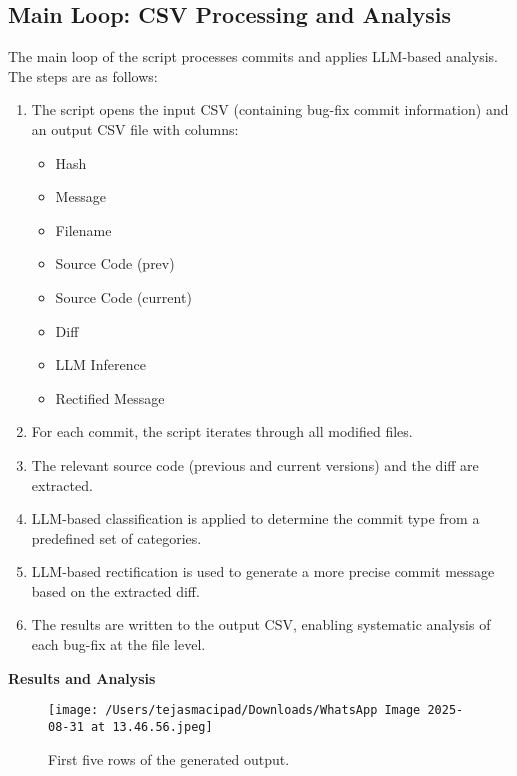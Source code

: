 \documentclass[12pt, a4paper]{report}
\newcommand{\sectionbar}[1]{%
  \vspace{0.6\baselineskip}%
  \noindent
  \colorbox{sectionbar}{%
    \parbox{\dimexpr\linewidth-2\fboxsep\relax}{%
      \textbf{\Large\textsf{#1}}%
    }%
  }%
  \vspace{0.6\baselineskip}
}
\begin{document}
    \subsection{Main Loop: CSV Processing and Analysis}
        The main loop of the script processes commits and applies LLM-based analysis. The steps are as follows:

        \begin{enumerate}
            \item The script opens the input CSV (containing bug-fix commit information) and an output CSV file with columns:
            \begin{itemize}
                \item Hash
                \item Message
                \item Filename
                \item Source Code (prev)
                \item Source Code (current)
                \item Diff
                \item LLM Inference
                \item Rectified Message
            \end{itemize}
            
            \item For each commit, the script iterates through all modified files.
            
            \item The relevant source code (previous and current versions) and the diff are extracted.
            
            \item LLM-based classification is applied to determine the commit type from a predefined set of categories.
            
            \item LLM-based rectification is used to generate a more precise commit message based on the extracted diff.
            
            \item The results are written to the output CSV, enabling systematic analysis of each bug-fix at the file level.
        \end{enumerate}

\sectionbar{Results and Analysis}

\begin{figure}[h!]
    \centering
    \texttt{[image: /Users/tejasmacipad/Downloads/WhatsApp Image 2025-08-31 at 13.46.56.jpeg]}
    \caption{First five rows of the generated output.}
\end{figure}
\end{document}
